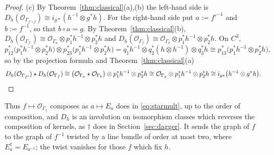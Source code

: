 \documentclass[11pt]{amsart}
\theoremstyle{definition}
\theoremstyle{remark}
\begin{document}
\begin{proof}
(c)  By Theorem~\ref{thm:classical}(a),(b) the left-hand side is
$D_h(\mathcal O_{\Gamma_{f'\circ f}})\cong i_{g*}(h^{-1}\otimes g^{*}h)$.  For
the right-hand side put $a:=f'^{-1}$ and $b:=f^{-1}$, so that $b\circ a=g$.
By Theorem~\ref{thm:classical}(b),
$D_h(\mathcal O_{\Gamma_{f'}})\cong\mathcal O_{\Gamma_a}\otimes
p_1^{*}h^{-1}\otimes p_2^{*}h$ and
$D_h(\mathcal O_{\Gamma_f})\cong\mathcal O_{\Gamma_b}\otimes
p_1^{*}h^{-1}\otimes p_2^{*}h$.  On $C^{3}$,
\[
p_{12}^{*}\bigl(p_1^{*}h^{-1}\otimes p_2^{*}h\bigr)\otimes
p_{23}^{*}\bigl(p_1^{*}h^{-1}\otimes p_2^{*}h\bigr)
=q_1^{*}h^{-1}\otimes q_2^{*}(h\otimes h^{-1})\otimes q_3^{*}h
\cong p_{13}^{*}\bigl(p_1^{*}h^{-1}\otimes p_2^{*}h\bigr),
\]
so by the projection formula and Theorem~\ref{thm:classical}(a)
\[
D_h(\mathcal O_{\Gamma_{f'}})\star D_h(\mathcal O_{\Gamma_f})\cong
\bigl(\mathcal O_{\Gamma_a}\star\mathcal O_{\Gamma_b}\bigr)\otimes
p_1^{*}h^{-1}\otimes p_2^{*}h\cong
\mathcal O_{\Gamma_{g}}\otimes p_1^{*}h^{-1}\otimes p_2^{*}h
\cong i_{g*}\bigl(h^{-1}\otimes g^{*}h\bigr).\qedhere
\]
\end{proof}

Thus $f\mapsto\mathcal O_{\Gamma_f}$ composes as $a\mapsto E_a$ does in
\eqref{eq:starmult}, up to the order of composition, and $D_h$ is an
involution on isomorphism classes which reverses the composition of kernels,
as $\dagger$ does in Section~\ref{sec:dagger}.  It sends the graph of $f$ to
the graph of $f^{-1}$ twisted by a line bundle of order at most two, where
$E_a^{\dagger}=E_{a^{-1}}$; the twist vanishes for those $f$ which fix $h$.
\end{document}
